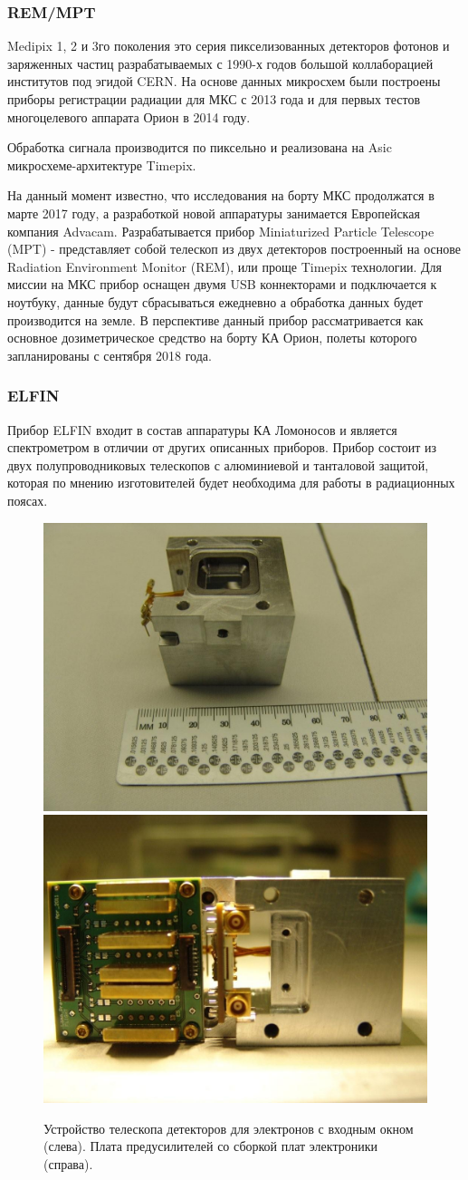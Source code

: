 \subsubsection{REM/MPT}
Medipix 1, 2 и 3го поколения это серия пикселизованных детекторов фотонов и заряженных частиц разрабатываемых с 1990-х годов большой коллаборацией институтов под эгидой CERN. На основе данных микросхем были построены приборы регистрации радиации для МКС с 2013 года и для первых тестов многоцелевого аппарата Орион в 2014 году.

Обработка сигнала производится по пиксельно и реализована на Asic микросхеме-архитектуре Timepix. 

На данный момент известно, что исследования на борту МКС продолжатся в марте 2017 году, а разработкой новой аппаратуры занимается Европейская компания Advacam. Разрабатывается прибор Miniaturized Particle Telescope (MPT)\cite{Fry2016} - представляет собой телескоп из двух детекторов построенный на основе Radiation Environment Monitor (REM)\cite{Kroupa2015}, или проще Timepix технологии. Для миссии на МКС прибор оснащен двумя USB коннекторами и подключается к ноутбуку,  данные будут сбрасываться ежедневно а обработка данных будет производится на земле. В перспективе данный прибор рассматривается как основное дозиметрическое средство на борту КА Орион, полеты которого запланированы с сентября 2018 года.

\subsubsection{ELFIN}
Прибор ELFIN входит в состав аппаратуры КА Ломоносов и является спектрометром в отличии от других описанных приборов. Прибор состоит из двух полупроводниковых телескопов с алюминиевой и танталовой защитой, которая по мнению изготовителей будет необходима для работы в радиационных поясах.
\begin{figure}
	\centering
	\includegraphics[width=0.49\linewidth]{images/elfin/DSC04260}
	\includegraphics[width=0.49\linewidth]{images/elfin/DSC04287}
	\caption{Устройство телескопа детекторов для электронов с входным окном (слева). 
	Плата предусилителей со сборкой плат электроники (справа). \cite{VassilisAngelopoulos}}
	\label{fig:dsc04260}
\end{figure}


